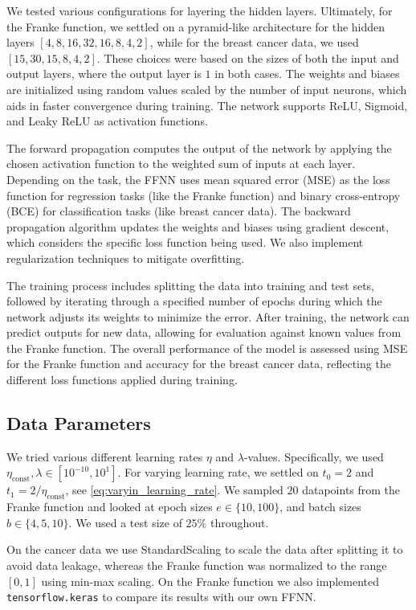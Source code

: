 \documentclass[%
reprint,s
amsmath,amssymb,
aps,
]{revtex4-2}
\begin{document}
We tested various configurations for layering the hidden layers. Ultimately, for the Franke function, we settled on a pyramid-like architecture for the hidden layers \([4,8,16,32,16,8,4,2]\), while for the breast cancer data, we used \([15,30,15,8,4,2]\). These choices were based on the sizes of both the input and output layers, where the output layer is \(1\) in both cases. The weights and biases are initialized using random values scaled by the number of input neurons, which aids in faster convergence during training. The network supports ReLU, Sigmoid, and Leaky ReLU as activation functions. 

The forward propagation computes the output of the network by applying the chosen activation function to the weighted sum of inputs at each layer. Depending on the task, the FFNN uses mean squared error (MSE) as the loss function for regression tasks (like the Franke function) and binary cross-entropy (BCE) for classification tasks (like breast cancer data). The backward propagation algorithm updates the weights and biases using gradient descent, which considers the specific loss function being used. We also implement regularization techniques to mitigate overfitting.

The training process includes splitting the data into training and test sets, followed by iterating through a specified number of epochs during which the network adjusts its weights to minimize the error. After training, the network can predict outputs for new data, allowing for evaluation against known values from the Franke function. The overall performance of the model is assessed using MSE for the Franke function and accuracy for the breast cancer data, reflecting the different loss functions applied during training.

\subsection{Data Parameters}
We tried various different learning rates \(\eta\) and \(\lambda\)-values. Specifically, we used \(\eta_{\text{const}}, \lambda \in[10^{-10}, 10^{1}]\). For varying learning rate, we settled on \(t_0=2\) and \(t_{1} = 2 / \eta_{\text{const}} \), see \eqref{eq:varyin_learning_rate}. We sampled \(20\) datapoints from the Franke function and looked at epoch sizes \(e \in \{10, 100\}\), and batch sizes \(b\in\{4, 5, 10\}\). 
We used a test size of \(25\%\) throughout. 

On the cancer data we use StandardScaling to scale the data after splitting it to avoid data leakage, whereas the Franke function was normalized to the range $[0,1]$ using min-max scaling. On the Franke function we also implemented \texttt{tensorflow.keras} to compare its results with our own FFNN.
\end{document}
